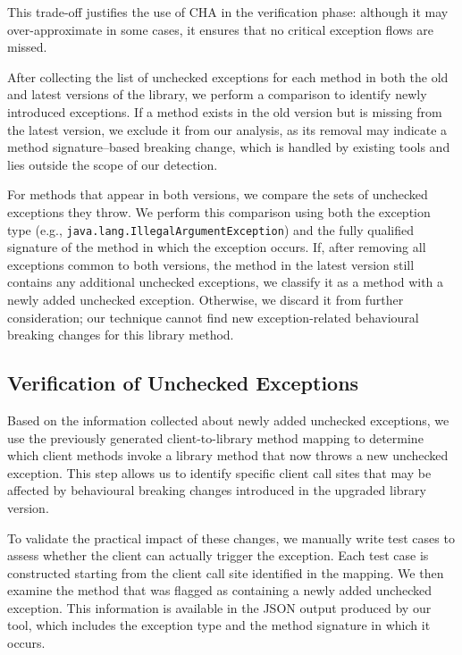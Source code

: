 This trade-off justifies the use of CHA in the verification phase: although it may over-approximate in some cases, it ensures that no critical exception flows are missed.

After collecting the list of unchecked exceptions for each method in both the old and latest versions of the library, we perform a comparison to identify newly introduced exceptions. If a method exists in the old version but is missing from the latest version, we exclude it from our analysis, as its removal may indicate a method signature–based breaking change, which is handled by existing tools and lies outside the scope of our detection.

For methods that appear in both versions, we compare the sets of unchecked exceptions they throw. We perform this comparison using both the exception type (e.g., \texttt{java.lang.IllegalArgumentException}) and the fully qualified signature of the method in which the exception occurs. If, after removing all exceptions common to both versions, the method in the latest version still contains any additional unchecked exceptions, we classify it as a method with a newly added unchecked exception. Otherwise, we discard it from further consideration; our technique cannot find new exception-related behavioural breaking changes for this library method.

\subsection{Verification of Unchecked Exceptions}

Based on the information collected about newly added unchecked exceptions, we use the previously generated client-to-library method mapping to determine which client methods invoke a library method that now throws a new unchecked exception. This step allows us to identify specific client call sites that may be affected by behavioural breaking changes introduced in the upgraded library version.

To validate the practical impact of these changes, we manually write test cases to assess whether the client can actually trigger the exception. Each test case is constructed starting from the client call site identified in the mapping. We then examine the method that was flagged as containing a newly added unchecked exception. This information is available in the JSON output produced by our tool, which includes the exception type and the method signature in which it occurs.

